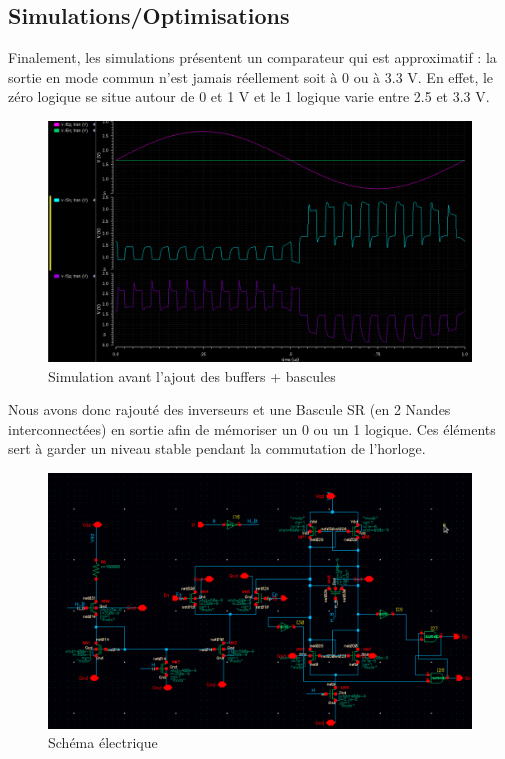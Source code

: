 \documentclass[11pt]{article}
\begin{document}
\subsection{Simulations/Optimisations}

Finalement, les simulations pr\'esentent un comparateur qui est approximatif : la sortie en mode
commun n'est jamais r\'eellement soit \`a 0 ou \`a 3.3 V. En effet, le z\'ero logique se situe autour de 0 et 1 V
et le 1 logique varie entre 2.5 et 3.3 V. 

\begin{figure}[!htb]
      \centering
      \includegraphics[width=0.8\linewidth]{simu_comp_pas_ameliore.png}
      \caption{Simulation avant l'ajout des buffers + bascules}
      \label{fig:sfigBSRFF}
\end{figure}%

Nous avons donc rajout\'e des inverseurs et une Bascule SR (en 2 Nandes interconnect\'ees) en sortie afin de m\'emoriser un 0 ou un 1 logique. Ces \'el\'ements sert \`a garder un niveau stable pendant la commutation de l'horloge.

\begin{figure}[!htb]
      \centering
      \includegraphics[width=0.9\linewidth]{comparateur_schema_cadence_SR.png}
      \caption{Sch\'ema \'electrique}
      \label{fig:schcompSR}
\end{figure}%
\end{document}
